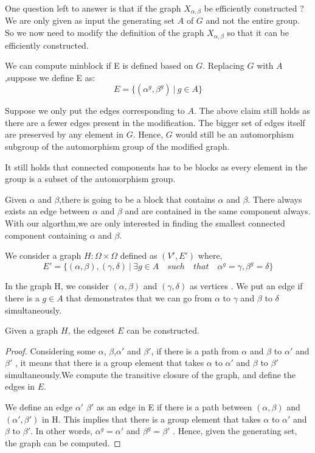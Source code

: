 
One question left to answer is that if the graph $X_{\alpha,\beta}$ be efficiently constructed ? We are only given as input the generating set $A$ of $G$ and not the entire group. So we now need to modify the definition of the graph $X_{\alpha,\beta}$ so that it can be efficiently constructed.


We can compute minblock if E is defined based on $G$. 
Replacing $G$ with $A$,suppose we define E as:
\[ E = \{(\alpha^{g},\beta^{g}) ~|~ g \in A\} \]

Suppose we only put the edges corresponding to $A$. The above claim still holds as there are a fewer edges present in the modification. The bigger set of edges itself are preserved by any element in $G$. Hence, $G$ would still be an automorphism subgroup of the automorphism group of the modified graph. 

It still holds that connected components has to be blocks as every element in the group is a subset of the automorphism group.

Given $\alpha$ and $\beta$,there is going to be a block that contains $\alpha$ and $\beta$. There always exists an edge between $\alpha$ and $\beta$ and are contained in the same component always. With our algorthm,we are only interested in finding the smallest connected component containing $\alpha$ and $\beta$.


We consider a graph $H : \Omega \times \Omega$ defined as $(V',E')$ where,
\[ E' = \{(\alpha,\beta),(\gamma,\delta) ~|~ \exists g \in A \quad such \quad that  \quad \alpha^g = \gamma , \beta^g = \delta\} \]

In the graph H, we consider $(\alpha , \beta)$ and $(\gamma , \delta)$ as vertices . We put an edge if there is a $g \in A$ that demonstrates that we can go from $\alpha$ to $\gamma$ and $\beta$ to $\delta$ simultaneously.

\begin{claim} Given a graph $H$, the edgeset $E$ can be constructed.
\begin{proof} Considering some $\alpha$, $\beta$,$\alpha'$ and $\beta'$, if there is a path from $\alpha$ and $\beta$ to $\alpha'$ and $\beta'$ , it means that there is a group element that takes $\alpha$ to $\alpha'$ and $\beta$ to $\beta'$ simultaneously.We compute the transitive closure of the graph, and define the edges in $E$.


We define an edge $\alpha'$ $\beta'$ as an edge in E if there is a path between $(\alpha,\beta)$ and $(\alpha',\beta')$ in H. This implies that there is a group element that takes $\alpha$ to $\alpha'$ and $\beta$ to $\beta'$. 
In other words, $\alpha^g = \alpha'$ and $\beta^g = \beta'$ .
Hence, given the generating set, the graph can be computed.
\end{proof}
\end{claim}


